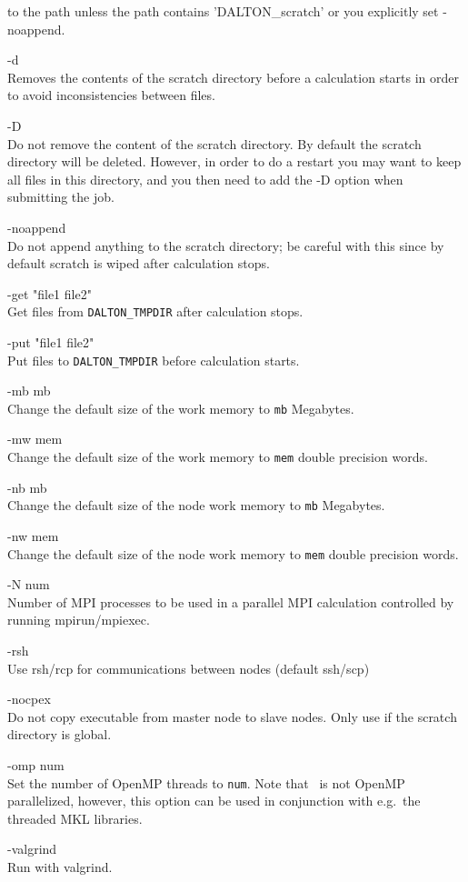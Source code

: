 \begin{list}{--}{}
  to the path unless the path contains 'DALTON\_scratch' or you explicitly set
  -noappend.
\item[-d \hfill] \hfill \\
  Removes the contents of the scratch directory before a
  calculation starts in order to avoid inconsistencies between files.
\item[-D \hfill] \hfill \\
  Do not remove the content of the scratch directory. By
  default the scratch directory will be deleted. However, in order to do
  a restart you may want to keep all files in this directory, and you
  then need to add the -D option when submitting the job.
\item[-noappend \hfill] \hfill \\
  Do not append anything to the scratch directory; be careful with
  this since by default scratch is wiped after calculation stops.
\item[-get "file1 file2" \hfill] \hfill \\
  Get files from \verb|DALTON_TMPDIR| after calculation stops.
\item[-put "file1 file2" \hfill] \hfill \\
  Put files to \verb|DALTON_TMPDIR| before calculation starts.
\item[-mb mb \hfill] \hfill \\
  Change the default size of the work memory
   to \verb|mb| Megabytes.
\item[-mw mem \hfill] \hfill \\
  Change the default size of the work memory
   to \verb|mem| double precision words.
\item[-nb mb \hfill] \hfill \\
  Change the default size of the node work memory
   to \verb|mb| Megabytes.
\item[-nw mem \hfill] \hfill \\
  Change the default size of the node work memory
   to \verb|mem| double precision words.
\item[-N num \hfill] \hfill \\
  Number of MPI processes to be used in a parallel MPI calculation
  controlled by running mpirun/mpiexec.
\item[-rsh \hfill] \hfill \\
  Use rsh/rcp for communications between nodes (default ssh/scp)
\item[-nocpex \hfill] \hfill \\
  Do not copy executable from master node to slave nodes. Only use if the scratch directory is global.
\item[-omp num\hfill] \hfill \\
  Set the number of OpenMP threads to \verb|num|. Note that \dalton\ is not OpenMP
  parallelized, however, this option can be used in conjunction with e.g.\ the
  threaded MKL libraries.
\item[-valgrind \hfill] \hfill \\
  Run with valgrind.
\end{list}

